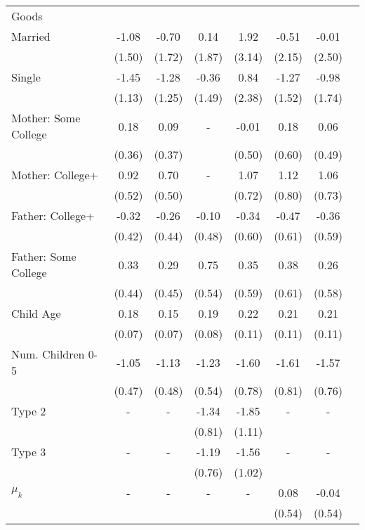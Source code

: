 \begin{tabular}{lccccccc}
Goods}\\\cmidrule(r){2-8}Married&-1.08&-0.70&0.14&1.92&-0.51&-0.01&\\&(1.50)&(1.72)&(1.87)&(3.14)&(2.15)&(2.50)&\\Single&-1.45&-1.28&-0.36&0.84&-1.27&-0.98&\\&(1.13)&(1.25)&(1.49)&(2.38)&(1.52)&(1.74)&\\Mother: Some College&0.18&0.09&-&-0.01&0.18&0.06&\\&(0.36)&(0.37)&&(0.50)&(0.60)&(0.49)&\\Mother: College+&0.92&0.70&-&1.07&1.12&1.06&\\&(0.52)&(0.50)&&(0.72)&(0.80)&(0.73)&\\Father: College+&-0.32&-0.26&-0.10&-0.34&-0.47&-0.36&\\&(0.42)&(0.44)&(0.48)&(0.60)&(0.61)&(0.59)&\\Father: Some College&0.33&0.29&0.75&0.35&0.38&0.26&\\&(0.44)&(0.45)&(0.54)&(0.59)&(0.61)&(0.58)&\\Child Age&0.18&0.15&0.19&0.22&0.21&0.21&\\&(0.07)&(0.07)&(0.08)&(0.11)&(0.11)&(0.11)&\\Num. Children 0-5&-1.05&-1.13&-1.23&-1.60&-1.61&-1.57&\\&(0.47)&(0.48)&(0.54)&(0.78)&(0.81)&(0.76)&\\Type 2&-&-&-1.34&-1.85&-&-&\\&&&(0.81)&(1.11)&&&\\Type 3&-&-&-1.19&-1.56&-&-&\\&&&(0.76)&(1.02)&&&\\$\mu_{k}$&-&-&-&-&0.08&-0.04&\\&&&&&(0.54)&(0.54)&\\\bottomrule\end{tabular}